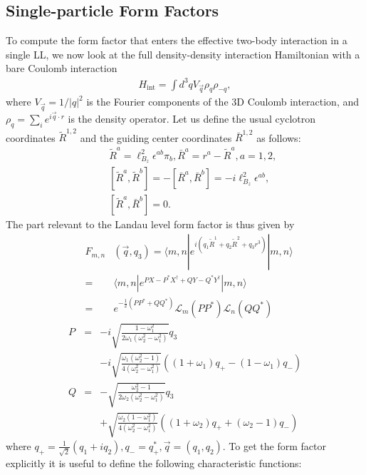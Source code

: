 \documentclass[twocolumn,showpacs,amsmath,amstex,amssymb,mathfonts,prb]{revtex4-1}
\begin{document}
\subsection{Single-particle Form Factors}
To compute the form factor that enters the effective two-body interaction in a single LL, we now look at the full density-density interaction Hamiltonian with a bare Coulomb interaction
\begin{eqnarray}\label{hint}
H_{\text{int}}=\int d^3qV_{\vec q}\rho_q\rho_{-q},
\end{eqnarray}
where $V_{\vec q}=1/|q|^2$ is the Fourier components of the 3D Coulomb interaction, and $\rho_q=\sum_ie^{i\vec q\cdot r}$ is the density operator. Let us define the usual cyclotron coordinates $\tilde R^{1,2}$ and the guiding center coordinates $\bar R^{1,2}$ as follows:
\begin{eqnarray}\label{coordinates}
&&\tilde R^a=\ell_{B_z}^2\epsilon^{ab}\pi_b, \bar R^a=r^a-\tilde R^a, a=1,2,\nonumber\\
&&[\tilde R^a,\tilde R^b]=-[\bar R^a,\bar R^b]=-i\ell_{B_z}^2\epsilon^{ab},\nonumber\\
&&[\tilde R^a,\bar R^b]=0.
\end{eqnarray}
The part relevant to the Landau level form factor is thus given by
\begin{eqnarray}
&F_{m,n}&\left(\vec q,q_3\right)=\langle m,n|e^{i\left(q_1\tilde R^1+q_2\tilde R^2+q_3r^3\right)}|m,n\rangle\nonumber\\
&=&\langle m,n|e^{PX-P^*X^\dagger+QY-Q^*Y^\dagger}|m,n\rangle\nonumber\\
&=&e^{-\frac{1}{2}\left(PP^*+QQ^*\right)}\mathcal L_m\left(PP^*\right)\mathcal L_n\left(QQ^*\right)
\end{eqnarray}
\begin{eqnarray}
P&=&-i\sqrt{\frac{1-\omega_1^2}{2\omega_1\left(\omega_2^2-\omega_1^2\right)}}q_3\nonumber\\
&&-i\sqrt{\frac{\omega_1\left(\omega_2^2-1\right)}{4\left(\omega_2^2-\omega_1^2\right)}}\left(\left(1+\omega_1\right)q_+-\left(1-\omega_1\right)q_-\right)\\
Q&=&-\sqrt{\frac{\omega_2^2-1}{2\omega_2\left(\omega_2^2-\omega_1^2\right)}}q_3\nonumber\\
&&+\sqrt{\frac{\omega_2\left(1-\omega_1^2\right)}{4\left(\omega_2^2-\omega_1^2\right)}}\left(\left(1+\omega_2\right)q_++\left(\omega_2-1\right)q_-\right)
\end{eqnarray}
where $q_+=\frac{1}{\sqrt{2}}\left(q_1+iq_2\right), q_-=q^*_+, \vec q=(q_1, q_2)$. To get the form factor explicitly it is useful to define the following characteristic functions:
\end{document}
